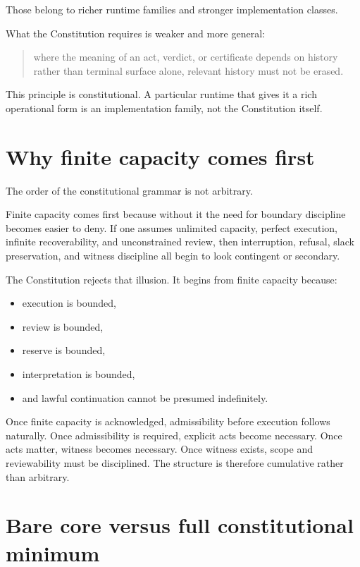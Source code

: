 \documentclass[11pt]{article}
\begin{document}
Those belong to richer runtime families and stronger implementation classes.

What the Constitution requires is weaker and more general:
\begin{quote}
where the meaning of an act, verdict, or certificate depends on history rather than terminal surface alone, relevant history must not be erased.
\end{quote}

This principle is constitutional. A particular runtime that gives it a rich operational form is an implementation family, not the Constitution itself.

\section{Why finite capacity comes first}

The order of the constitutional grammar is not arbitrary.

Finite capacity comes first because without it the need for boundary discipline becomes easier to deny. If one assumes unlimited capacity, perfect execution, infinite recoverability, and unconstrained review, then interruption, refusal, slack preservation, and witness discipline all begin to look contingent or secondary.

The Constitution rejects that illusion. It begins from finite capacity because:
\begin{itemize}[leftmargin=2em]
    \item execution is bounded,
    \item review is bounded,
    \item reserve is bounded,
    \item interpretation is bounded,
    \item and lawful continuation cannot be presumed indefinitely.
\end{itemize}

Once finite capacity is acknowledged, admissibility before execution follows naturally. Once admissibility is required, explicit acts become necessary. Once acts matter, witness becomes necessary. Once witness exists, scope and reviewability must be disciplined. The structure is therefore cumulative rather than arbitrary.

\section{Bare core versus full constitutional minimum}
\end{document}
